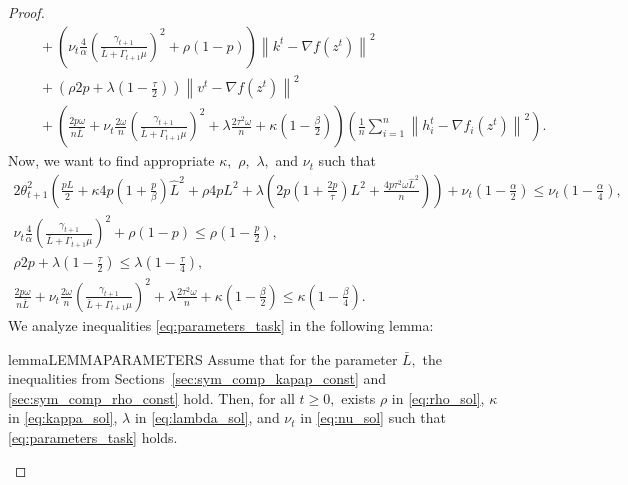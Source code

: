 \documentclass{article} %
\newcommand{\norm}[1]{\left\| #1 \right\|}
\theoremstyle{plain}
\theoremstyle{definition}
\theoremstyle{remark}
\begin{document}
\begin{proof}
\begin{align*}
    &\quad + \left(\nu_{t} \frac{4}{\alpha} \left(\frac{\gamma_{t+1}}{\bar{L} + \Gamma_{t+1} \mu}\right)^2 + \rho (1 - p)\right) \norm{k^{t} - \nabla f(z^t)}^2 \\
    &\quad + \left(\rho 2 p + \lambda \left(1 - \frac{\tau}{2}\right)\right) \norm{v^{t} - \nabla f(z^t)}^2 \\
    &\quad + \left(\frac{2 p \omega}{n \bar{L}} + \nu_{t} \frac{2 \omega}{n} \left(\frac{\gamma_{t+1}}{\bar{L} + \Gamma_{t+1} \mu}\right)^2 + \lambda \frac{2 \tau^2 \omega}{n} + \kappa \left(1 - \frac{\beta}{2}\right)\right) \left(\frac{1}{n}\sum_{i=1}^n \norm{h_i^t - \nabla f_i(z^{t})}^2\right).
  \end{align*}
  Now, we want to find appropriate $\kappa,$ $\rho,$ $\lambda,$ and $\nu_{t}$ such that
  \begin{equation}
  \begin{gathered}
    2 \theta_{t+1}^2 \left(\frac{pL}{2} + \kappa 4 p \left(1 + \frac{p}{\beta}\right) \widehat{L}^2 + \rho 4 p L^2 + \lambda \left(2 p \left(1 + \frac{2 p}{\tau}\right) L^2 + \frac{4 p \tau^2 \omega \widehat{L}^2}{n}\right) \right) + \nu_{t} \left(1 - \frac{\alpha}{2}\right) \leq \nu_{t} \left(1 - \frac{\alpha}{4}\right), \\
    \nu_{t} \frac{4}{\alpha} \left(\frac{\gamma_{t+1}}{\bar{L} + \Gamma_{t+1} \mu}\right)^2 + \rho (1 - p) \leq \rho \left(1 - \frac{p}{2}\right), \\
    \rho 2 p + \lambda \left(1 - \frac{\tau}{2}\right) \leq \lambda \left(1 - \frac{\tau}{4}\right), \\
    \frac{2 p \omega}{n \bar{L}} + \nu_{t} \frac{2 \omega}{n} \left(\frac{\gamma_{t+1}}{\bar{L} + \Gamma_{t+1} \mu}\right)^2 + \lambda \frac{2 \tau^2 \omega}{n} + \kappa \left(1 - \frac{\beta}{2}\right)\leq \kappa \left(1 - \frac{\beta}{4}\right).
  \end{gathered}
  \label{eq:parameters_task}
  \end{equation}
  We analyze inequalities \eqref{eq:parameters_task} in the following lemma:
  \begin{restatable}{lemma}{LEMMAPARAMETERS}
    \label{lemma:parameters}
    Assume that for the parameter $\bar{L},$ the inequalities from Sections~\ref{sec:sym_comp_kapap_const} and \ref{sec:sym_comp_rho_const} hold. Then, for all $t \geq 0,$ exists $\rho$ in \eqref{eq:rho_sol}, $\kappa$ in \eqref{eq:kappa_sol}, $\lambda$ in \eqref{eq:lambda_sol}, and $\nu_{t}$ in \eqref{eq:nu_sol} such that \eqref{eq:parameters_task} holds.
  \end{restatable}

\end{proof}
\end{document}
